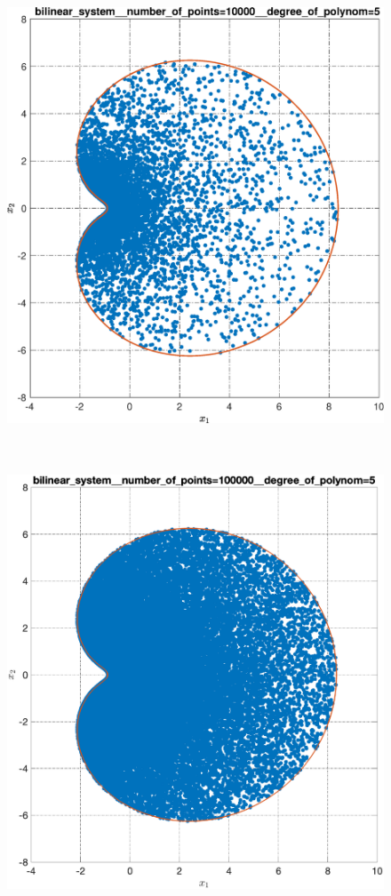 \documentclass[../main.tex]{subfiles}
\begin{document}
\begin{figure}[ht!]
\begin{minipage}[b]{.4\linewidth}
  		\includegraphics[width=\linewidth]{images/bilinear_system__number_of_points=10000__degree_of_polynom=5.eps}
  	\end{minipage} 
  	\vfill
  	\hspace{-2.5ex}
  	\begin{minipage}[b]{.4\linewidth} 
  		\small
  		\centering 
  		\includegraphics[width=\linewidth]{images/bilinear_system__number_of_points=100000__degree_of_polynom=5.eps}

\end{minipage}
\end{figure}
\end{document}
